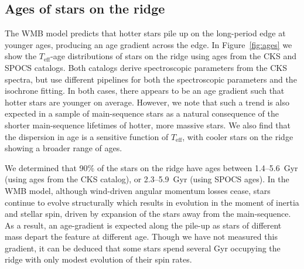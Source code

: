 \documentclass[twocolumn]{aastex631}
\newcommand{\teff}{\ensuremath{T_{\mathrm{eff}}}\xspace}
\begin{document}

\subsection{Ages of stars on the ridge}
\label{subsec:ages}
The WMB model predicts that hotter stars pile up on the long-period edge at younger ages, producing an age gradient across the edge. In Figure~\ref{fig:ages} we show the \teff-age distributions of stars on the ridge using ages from the CKS and SPOCS \citep{Brewer2018} catalogs. Both catalogs derive spectroscopic parameters from the CKS spectra, but use different pipelines for both the spectroscopic parameters and the isochrone fitting. In both cases, there appears to be an age gradient such that hotter stars are younger on average. However, we note that such a trend is also expected in a sample of main-sequence stars as a natural consequence of the shorter main-sequence lifetimes of hotter, more massive stars. We also find that the dispersion in age is a sensitive function of \teff, with cooler stars on the ridge showing a broader range of ages. 

We determined that 90\% of the stars on the ridge have ages between 1.4--5.6~Gyr (using ages from the CKS catalog), or 2.3--5.9~Gyr (using SPOCS ages). In the WMB model, although wind-driven angular momentum losses cease, stars continue to evolve structurally which results in evolution in the moment of inertia and stellar spin, driven by expansion of the stars away from the main-sequence. As a result, an age-gradient is expected along the pile-up as stars of different mass depart the feature at different age. Though we have not measured this gradient, it can be deduced that some stars spend several Gyr occupying the ridge with only modest evolution of their spin rates.




\iffalse
\begin{figure*}
    \centering
    \texttt{[image: ages.pdf]}
    \caption{Above, H-R diagram placement of Rossby ridge stars relative to the Sun and the CKS sample (a) and similarly for the LAMOST--Kepler sample (b). Below, the \teff-age plane for CKS stars along the ridge using isochrone ages from the CKS (c) and SPOCS (d) catalogs.}
    \label{fig:ages}
\end{figure*}
\fi 
\end{document}
